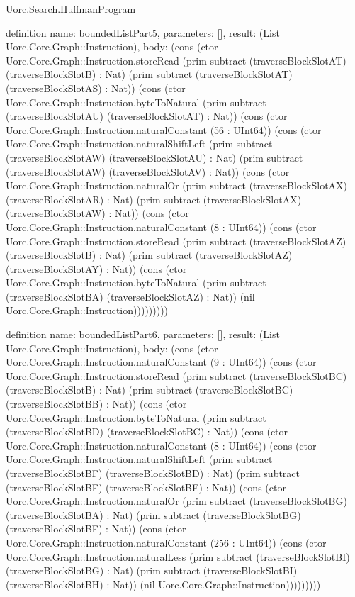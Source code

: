 \begin{lexlean}{Uorc.Search.HuffmanProgram}
\begin{semanticmodule}
definition{
  name: boundedListPart5,
  parameters: [],
  result: (List Uorc.Core.Graph::Instruction),
  body: (cons (ctor Uorc.Core.Graph::Instruction.storeRead (prim subtract (traverseBlockSlotAT) (traverseBlockSlotB) : Nat) (prim subtract (traverseBlockSlotAT) (traverseBlockSlotAS) : Nat)) (cons (ctor Uorc.Core.Graph::Instruction.byteToNatural (prim subtract (traverseBlockSlotAU) (traverseBlockSlotAT) : Nat)) (cons (ctor Uorc.Core.Graph::Instruction.naturalConstant (56 : UInt64)) (cons (ctor Uorc.Core.Graph::Instruction.naturalShiftLeft (prim subtract (traverseBlockSlotAW) (traverseBlockSlotAU) : Nat) (prim subtract (traverseBlockSlotAW) (traverseBlockSlotAV) : Nat)) (cons (ctor Uorc.Core.Graph::Instruction.naturalOr (prim subtract (traverseBlockSlotAX) (traverseBlockSlotAR) : Nat) (prim subtract (traverseBlockSlotAX) (traverseBlockSlotAW) : Nat)) (cons (ctor Uorc.Core.Graph::Instruction.naturalConstant (8 : UInt64)) (cons (ctor Uorc.Core.Graph::Instruction.storeRead (prim subtract (traverseBlockSlotAZ) (traverseBlockSlotB) : Nat) (prim subtract (traverseBlockSlotAZ) (traverseBlockSlotAY) : Nat)) (cons (ctor Uorc.Core.Graph::Instruction.byteToNatural (prim subtract (traverseBlockSlotBA) (traverseBlockSlotAZ) : Nat)) (nil Uorc.Core.Graph::Instruction)))))))))
}

definition{
  name: boundedListPart6,
  parameters: [],
  result: (List Uorc.Core.Graph::Instruction),
  body: (cons (ctor Uorc.Core.Graph::Instruction.naturalConstant (9 : UInt64)) (cons (ctor Uorc.Core.Graph::Instruction.storeRead (prim subtract (traverseBlockSlotBC) (traverseBlockSlotB) : Nat) (prim subtract (traverseBlockSlotBC) (traverseBlockSlotBB) : Nat)) (cons (ctor Uorc.Core.Graph::Instruction.byteToNatural (prim subtract (traverseBlockSlotBD) (traverseBlockSlotBC) : Nat)) (cons (ctor Uorc.Core.Graph::Instruction.naturalConstant (8 : UInt64)) (cons (ctor Uorc.Core.Graph::Instruction.naturalShiftLeft (prim subtract (traverseBlockSlotBF) (traverseBlockSlotBD) : Nat) (prim subtract (traverseBlockSlotBF) (traverseBlockSlotBE) : Nat)) (cons (ctor Uorc.Core.Graph::Instruction.naturalOr (prim subtract (traverseBlockSlotBG) (traverseBlockSlotBA) : Nat) (prim subtract (traverseBlockSlotBG) (traverseBlockSlotBF) : Nat)) (cons (ctor Uorc.Core.Graph::Instruction.naturalConstant (256 : UInt64)) (cons (ctor Uorc.Core.Graph::Instruction.naturalLess (prim subtract (traverseBlockSlotBI) (traverseBlockSlotBG) : Nat) (prim subtract (traverseBlockSlotBI) (traverseBlockSlotBH) : Nat)) (nil Uorc.Core.Graph::Instruction)))))))))
}


\end{semanticmodule}
\end{lexlean}
